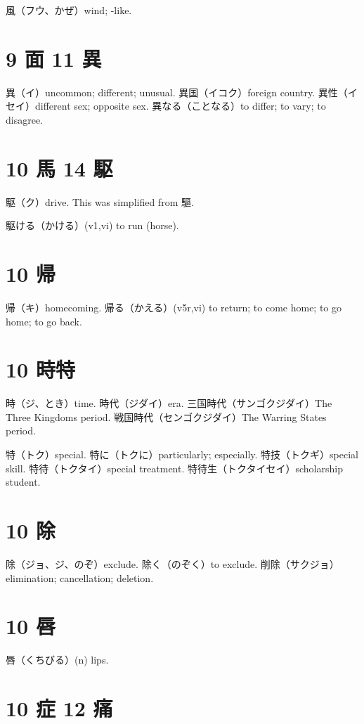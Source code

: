 風（フウ、かぜ）wind; -like.

\section{9 面 11 異}

異（イ）uncommon; different; unusual.
異国（イコク）foreign country.
異性（イセイ）different sex; opposite sex.
異なる（ことなる）to differ; to vary; to disagree.

\section{10 馬 14 駆}

駆（ク）drive.
This was simplified from 驅.

駆ける（かける）(v1,vi) to run (horse).

\section{10 帰}

帰（キ）homecoming.
帰る（かえる）(v5r,vi)
to return; to come home; to go home; to go back.

\section{10 時特}

時（ジ、とき）time.
時代（ジダイ）era.
三国時代（サンゴクジダイ）The Three Kingdoms period.
戦国時代（センゴクジダイ）The Warring States period.

特（トク）special.
特に（トクに）particularly; especially.
特技（トクギ）special skill.
特待（トクタイ）special treatment.
特待生（トクタイセイ）scholarship student.

\section{10 除}

除（ジョ、ジ、のぞ）exclude.
除く（のぞく）to exclude.
削除（サクジョ）elimination; cancellation; deletion.

\section{10 唇}

唇（くちびる）(n) lips.

\section{10 症 12 痛}

